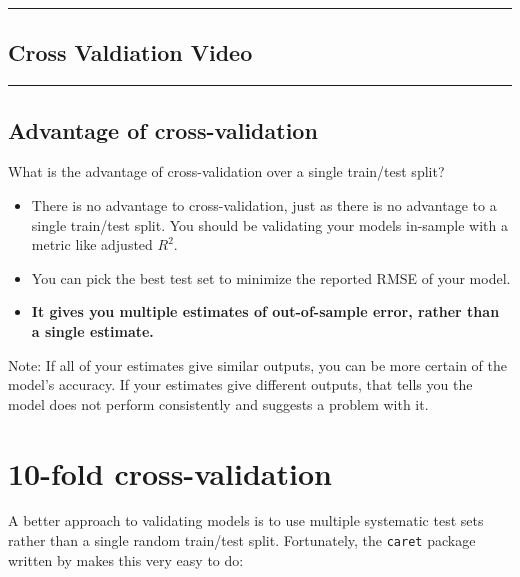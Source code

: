 \documentclass[
]{book}
\begin{document}
\begin{center}\rule{0.5\linewidth}{0.5pt}\end{center}

\hypertarget{cross-valdiation-video}{%
\subsection*{Cross Valdiation Video}\label{cross-valdiation-video}}

\begin{center}\rule{0.5\linewidth}{0.5pt}\end{center}

\hypertarget{advantage-of-cross-validation}{%
\subsection*{Advantage of cross-validation}\label{advantage-of-cross-validation}}

What is the advantage of cross-validation over a single train/test split?

\begin{itemize}
\item
  There is no advantage to cross-validation, just as there is no advantage to a single train/test split. You should be validating your models in-sample with a metric like adjusted \(R^2\).
\item
  You can pick the best test set to minimize the reported RMSE of your model.
\item
  \textbf{It gives you multiple estimates of out-of-sample error, rather than a single estimate.}
\end{itemize}

Note: If all of your estimates give similar outputs, you can be more certain of the model's accuracy. If your estimates give different outputs, that tells you the model does not perform consistently and suggests a problem with it.

\hypertarget{fold-cross-validation}{%
\section{10-fold cross-validation}\label{fold-cross-validation}}

A better approach to validating models is to use multiple systematic test sets rather than a single random train/test split. Fortunately, the \texttt{caret} package written by \citet{R-caret} makes this very easy to do:
\end{document}
